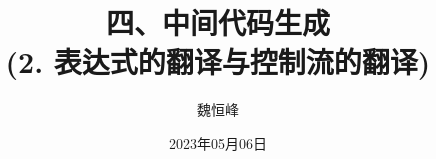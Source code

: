 \documentclass[]{beamer}
\title[语义分析]{四、中间代码生成 \\ (2. 表达式的翻译与控制流的翻译)}
\author[魏恒峰]{\large 魏恒峰}
\institute{hfwei@nju.edu.cn}
\date{2023年05月06日}
\begin{document}
\maketitle

% 





\thankyou{}

\end{document}
